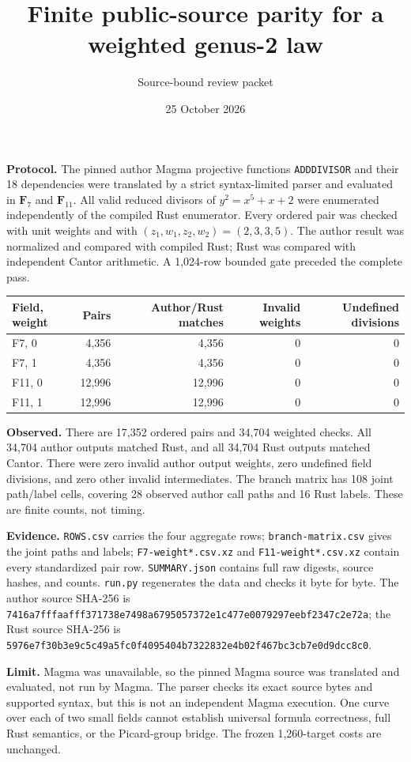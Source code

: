 \documentclass[11pt]{article}
\begin{document}
\title{Finite public-source parity for a weighted genus-2 law}
\author{Source-bound review packet}
\date{25 October 2026}
\maketitle
\noindent\textbf{Protocol.} The pinned author Magma projective functions
\texttt{ADDDIVISOR} and their 18 dependencies were translated by a strict
syntax-limited parser and evaluated in $\mathbf F_7$ and $\mathbf F_{11}$.
All valid reduced divisors of $y^2=x^5+x+2$ were enumerated independently
of the compiled Rust enumerator. Every ordered pair was checked with unit
weights and with $(z_1,w_1,z_2,w_2)=(2,3,3,5)$.
The author result was normalized and compared with compiled Rust; Rust was
compared with independent Cantor arithmetic. A 1,024-row bounded gate
preceded the complete pass.

\begin{center}
\begin{tabular}{lrrrr}
Field, weight & Pairs & Author/Rust matches & Invalid weights & Undefined divisions\\\hline
F7, 0 & 4,356 & 4,356 & 0 & 0 \\
F7, 1 & 4,356 & 4,356 & 0 & 0 \\
F11, 0 & 12,996 & 12,996 & 0 & 0 \\
F11, 1 & 12,996 & 12,996 & 0 & 0 \\
\end{tabular}
\end{center}

\noindent\textbf{Observed.} There are 17,352 ordered pairs and 34,704
weighted checks. All 34,704 author outputs matched Rust, and all 34,704
Rust outputs matched Cantor. There were zero invalid author output weights,
zero undefined field divisions, and zero other invalid intermediates.
The branch matrix has 108 joint path/label cells, covering 28 observed
author call paths and 16 Rust labels. These are finite counts, not timing.

\noindent\textbf{Evidence.} \texttt{ROWS.csv} carries the four aggregate rows;
\texttt{branch-matrix.csv} gives the joint paths and labels;
\texttt{F7-weight*.csv.xz} and \texttt{F11-weight*.csv.xz} contain every
standardized pair row. \texttt{SUMMARY.json} contains full raw digests,
source hashes, and counts. \texttt{run.py} regenerates the data and checks
it byte for byte. The author source SHA-256 is
\texttt{7416a7fffaafff371738e7498a6795057372e1c477e0079297eebf2347c2e72a}; the Rust source SHA-256 is
\texttt{5976e7f30b3e9c5c49a5fc0f4095404b7322832e4b02f467bc3cb7e0d9dcc8c0}.

\noindent\textbf{Limit.} Magma was unavailable, so the pinned Magma source
was translated and evaluated, not run by Magma. The parser checks its exact
source bytes and supported syntax, but this is not an independent Magma
execution. One curve over each of two small fields cannot establish
universal formula correctness, full Rust semantics, or the Picard-group
bridge. The frozen 1,260-target costs are unchanged.
\end{document}
